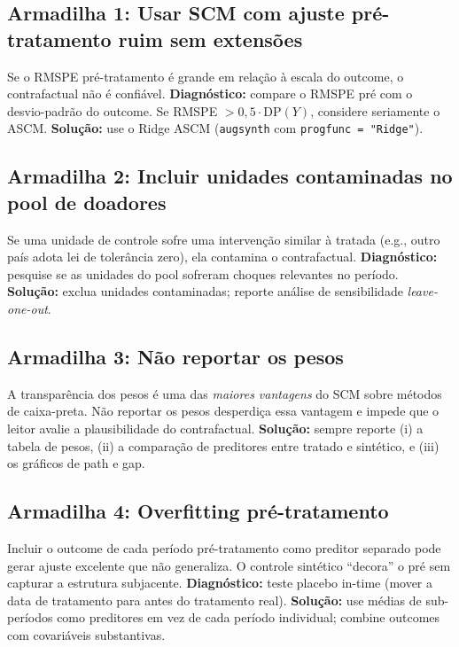 \documentclass[12pt, a4paper, openany]{book}
\begin{document}
\subsection{Armadilha 1: Usar SCM com ajuste pré-tratamento ruim sem extensões}

Se o RMSPE pré-tratamento é grande em relação à escala do outcome, o contrafactual não é confiável. \textbf{Diagnóstico:} compare o RMSPE pré com o desvio-padrão do outcome. Se RMSPE $ > 0{,}5 \cdot \text{DP}(Y)$, considere seriamente o ASCM. \textbf{Solução:} use o Ridge ASCM (\texttt{augsynth} com \texttt{progfunc = "Ridge"}).

\subsection{Armadilha 2: Incluir unidades contaminadas no pool de doadores}

Se uma unidade de controle sofre uma intervenção similar à tratada (e.g., outro país adota lei de tolerância zero), ela contamina o contrafactual. \textbf{Diagnóstico:} pesquise se as unidades do pool sofreram choques relevantes no período. \textbf{Solução:} exclua unidades contaminadas; reporte análise de sensibilidade \textit{leave-one-out}.

\subsection{Armadilha 3: Não reportar os pesos}

A transparência dos pesos é uma das \textit{maiores vantagens} do SCM sobre métodos de caixa-preta. Não reportar os pesos desperdiça essa vantagem e impede que o leitor avalie a plausibilidade do contrafactual. \textbf{Solução:} sempre reporte (i) a tabela de pesos, (ii) a comparação de preditores entre tratado e sintético, e (iii) os gráficos de path e gap.

\subsection{Armadilha 4: Overfitting pré-tratamento}

Incluir o outcome de cada período pré-tratamento como preditor separado pode gerar ajuste excelente que não generaliza. O controle sintético ``decora'' o pré sem capturar a estrutura subjacente. \textbf{Diagnóstico:} teste placebo in-time (mover a data de tratamento para antes do tratamento real). \textbf{Solução:} use médias de sub-períodos como preditores em vez de cada período individual; combine outcomes com covariáveis substantivas.
\end{document}
